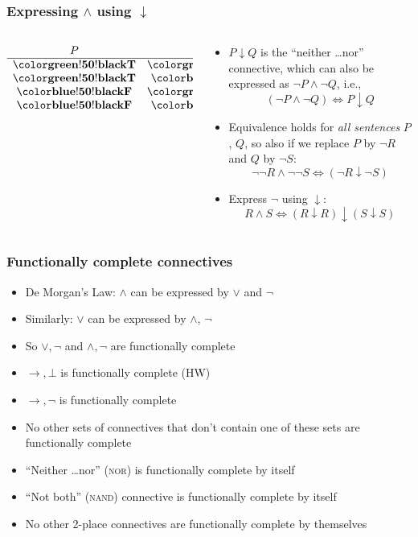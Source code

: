 \begin{frame}
    \frametitle{Expressing $\land$ using $\downarrow$}

\begin{columns}
\begin{column}{3cm}
\[\begin{array}{cc|c}
P & Q & (P \downarrow Q)\\
\hline
\True & \True & \False\\
\True & \False & \False\\
\False & \True & \False\\
\False & \False & \True
\end{array}\]
\end{column}
\begin{column}{7cm}
\begin{itemize}[<+->]
\item $P \downarrow Q$ is the ``neither \dots nor'' connective, which can also
be expressed as $\lnot P \land \lnot Q$, i.e.,
\[ (\lnot P \land \lnot Q) \Leftrightarrow P \downarrow Q \]
\item Equivalence holds for \emph{all sentences} $P$, $Q$, so also if we replace $P$ by $\lnot R$ and $Q$ by $\lnot S$:
\[
\lnot\lnot R \land \lnot\lnot S \Leftrightarrow (\lnot R \downarrow \lnot S)
\]
\item Express $\lnot$ using $\downarrow$:
\[
R \land S \Leftrightarrow (R \downarrow R)\downarrow(S \downarrow S)
\]
\end{itemize}
\end{column}
\end{columns}

\end{frame}

\begin{frame}
    \frametitle{Functionally complete connectives}

\begin{itemize}[<+->]
\item De Morgan's Law: $\land$ can be expressed by $\lor$ and $\lnot$
\item Similarly: $\lor$ can be expressed by $\land$, $\lnot$
\item So $\lor, \lnot$ and $\land, \lnot$ are
  functionally complete
\item $\to, \bot$ is functionally complete (HW)
\item $\to, \lnot$ is functionally complete
\item No other sets of connectives that don't contain one of these
sets are functionally complete
\item ``Neither \dots nor'' (\textsc{nor}) is functionally complete by itself
\item ``Not both'' (\textsc{nand}) connective is functionally complete by itself
\item No other 2-place connectives are functionally complete by themselves
  \end{itemize}
\end{frame}


